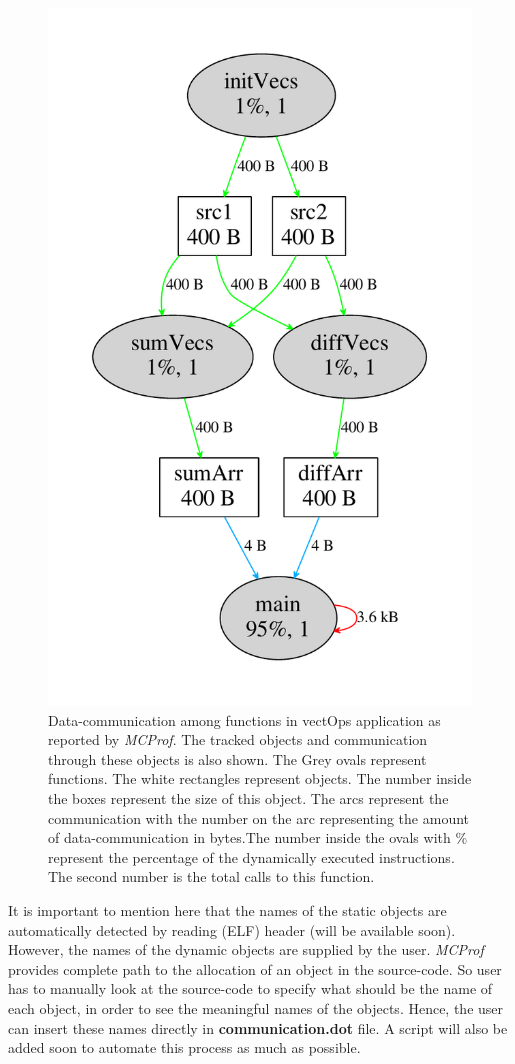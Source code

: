 \documentclass[10pt]{article}
\newcommand{\MCPROF}{\emph{MCProf}}
\begin{document}
\begin{figure}[!h]
\centering
\includegraphics[width=0.55\linewidth]{figures/commWithObjects.pdf}
\caption{Data-communication among functions in vectOps application as reported
    by \MCPROF{}. The tracked objects and communication through these objects
    is also shown. The Grey ovals represent functions. The white rectangles
    represent objects. The number inside the boxes represent the size of this
    object. The arcs represent the communication with the number on
    the arc representing the amount of data-communication in bytes.The number
    inside the ovals with \% represent the percentage of the dynamically
    executed instructions. The second number is the total calls to this function.}
\label{fig:commWithObjects}
\end{figure}

It is important to mention here that the names of the static objects are 
automatically detected by reading (ELF) header (will be available soon). 
However, the names of the dynamic objects are supplied by the user. \MCPROF{} 
provides complete path to the allocation of an object in the source-code. So 
user has to manually look at the source-code to specify what should be the name 
of each object, in order to see the meaningful names of the objects. Hence, the 
user can insert these names directly in \textbf{communication.dot} file. A 
script will also be added soon to automate this process as much as possible.
\end{document}
